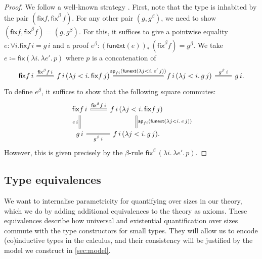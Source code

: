 \documentclass[10pt,a4paper]{article}
\theoremstyle{definition}
\theoremstyle{remark}
\renewcommand{\.}{.\,} %
\renewcommand{\:}{:} %
\newcommand{\fix}{\mathsf{fix}}
\newcommand{\0}{\mathbf{0}}
\newcommand{\1}{\mathbf{1}}
\newcommand\<\langle
\renewcommand\>\rangle
\renewcommand\sf\mathsf
\theoremstyle{remark}
\begin{document}
\begin{proof}
We follow a well-known strategy \cite[Theorem 5.4.7]{hottbook} \cite[Lemma 3.2]{guarded-cubical}.
First, note that the type is inhabited by the pair $(\fix f, \fix^\beta \, f)$. For any other pair $(g, g^\beta)$, we need to show $(\fix f, \fix^\beta f) = (g, g^\beta)$.
For this, it suffices to give a pointwise equality \(e:\forall i.\fix f\,i=g\,i\) and a proof \(e^\beta:(\sf{funext}(e))_*\,(\fix^\beta f)=g^\beta\).
We take \(e\coloneqq \fix(\lambda i\.\lambda e'\.p)\) where \(p\) is a concatenation of \[\hfill\begin{tikzcd}
    \fix f\,i \ar[r,"\fix^\beta f\,i",equal] & f\,i\,(\lambda j<i\.\fix f\,j) \ar[rrr,"{\mathsf{ap}_{fi}(\mathsf{funext}(\lambda j<i\.e'\,j))}",equal] &&& f\,i\,(\lambda j<i\.g\,j) \ar[r, "g^\beta\,i",equal] & g\,i.
\end{tikzcd}\hfill\]
To define \(e^\beta\), it suffices to show that the following square commutes: \[\hfill\begin{tikzcd}
    \fix f\,i \ar[r,"\fix^\beta f\,i",equal]\ar[d,"e\,i"',equal] & f\,i\,(\lambda j<i\.\fix f\,j) \ar[d,"{\mathsf{ap}_{fi}(\mathsf{funext}(\lambda j<i\.e\,j))}",equal] \\
    g\,i & f\,i\,(\lambda j<i\.g\,j). \ar[l, "g^\beta\,i",equal]
\end{tikzcd}\hfill\]
However, this is given precisely by the \(\beta\)-rule \(\fix^\beta\,(\lambda i\.\lambda e'\.p)\).
\end{proof}

\subsection{Type equivalences}
\label{ss:equivalences}
We want to internalise parametricity for quantifying over sizes in our theory, which we do by adding additional equivalences to the theory as axioms. These equivalences describe how universal and existential quantification over sizes commute with the type constructors for small types. They will allow us to encode (co)inductive types in the calculus, and their consistency will be justified by the model we construct in \ref{sec:model}. 
\end{document}
